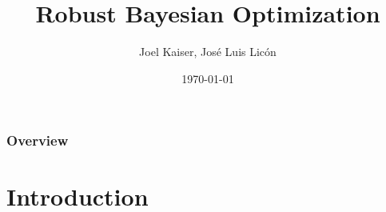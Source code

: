 \documentclass[10pt,handout]{beamer}
\title[RoBO]
{Robust Bayesian Optimization}
\author{Joel Kaiser, José Luis Licón}
\institute[Uni Freiburg] %
{
Albert-Ludwigs-Universität Freiburg \\ %
\medskip
}
\date{\today} %
\begin{document}



\begin{frame}
\titlepage %
\end{frame}

\begin{frame}
\frametitle{Overview} %
\tableofcontents %
\end{frame}


\section{Introduction}





%
%
%
%
%
%
%
\end{document}
